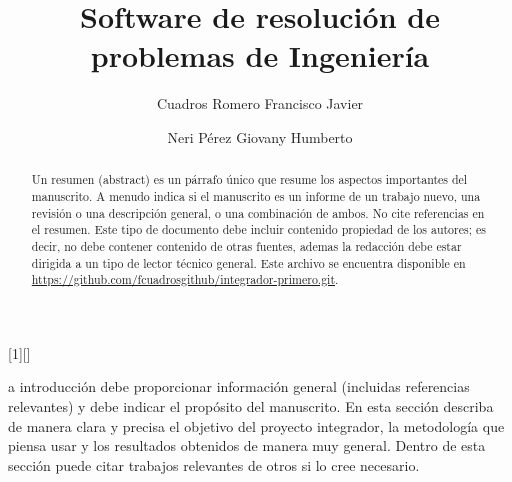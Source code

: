 \documentclass{IEEEcsmag}
\begin{document}
[1][]
{}
{}



\title{Software de resolución de problemas de Ingeniería }

\author{Cuadros Romero Francisco Javier}

\author{Neri Pérez Giovany Humberto}



\begin{abstract}
Un resumen (abstract) es un párrafo único que resume los aspectos importantes del manuscrito. A menudo indica si el manuscrito es un informe de un trabajo nuevo, una revisión o una descripción general, o una combinación de ambos. No cite referencias en el resumen. Este tipo de documento debe incluir contenido propiedad de los autores; es decir, no debe contener contenido de otras fuentes, ademas la redacción debe  estar dirigida a un tipo de lector técnico general. Este archivo se encuentra disponible en \href{https://github.com/fcuadrosgithub/integrador-primero.git}{https://github.com/fcuadrosgithub/integrador-primero.git}.
\end{abstract}

\maketitle
{}a introducción debe proporcionar información general (incluidas referencias relevantes) y debe indicar el propósito del manuscrito. En esta sección describa de manera clara y precisa el objetivo del proyecto integrador, la metodología que piensa usar y los resultados obtenidos de manera muy general. Dentro de esta sección puede citar trabajos relevantes de otros si lo cree necesario.
\end{document}
